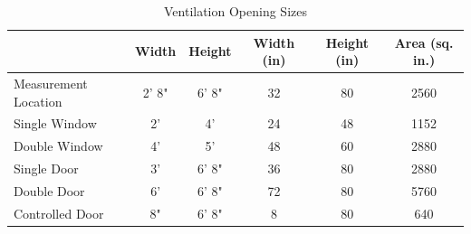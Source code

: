 \documentclass[12pt,oneside]{book}
\begin{document}
\vspace*{\baselineskip}

\begin{table}[!ht]
\centering
\caption{Ventilation Opening Sizes}\label{Vent_Sizes}
\begin{tabular}{lccccc}
\toprule[1.5pt]
 & Width & Height & Width (in) & Height (in) & Area (sq. in.) \\ 
\midrule
\multicolumn{1}{l}{Measurement Location} & 2' 8" & 6' 8" & 32 & \multicolumn{1}{c}{80} & 2560 \\
\multicolumn{1}{l}{Single Window} & 2' & 4' & 24 & \multicolumn{1}{c}{48} & 1152 \\
\multicolumn{1}{l}{Double Window} & 4' & 5' & 48 & \multicolumn{1}{c}{60} & 2880 \\
\multicolumn{1}{l}{Single Door} & 3' & 6' 8" & 36 & \multicolumn{1}{c}{80} & 2880 \\
\multicolumn{1}{l}{Double Door} & 6' & 6' 8" & 72 & \multicolumn{1}{c}{80} & 5760 \\
\multicolumn{1}{l}{Controlled Door} & 8" & 6' 8" & 8 & \multicolumn{1}{c}{80} & 640 \\ 
\bottomrule[1.25pt]
\end{tabular}
\end{table}


\end{document}
